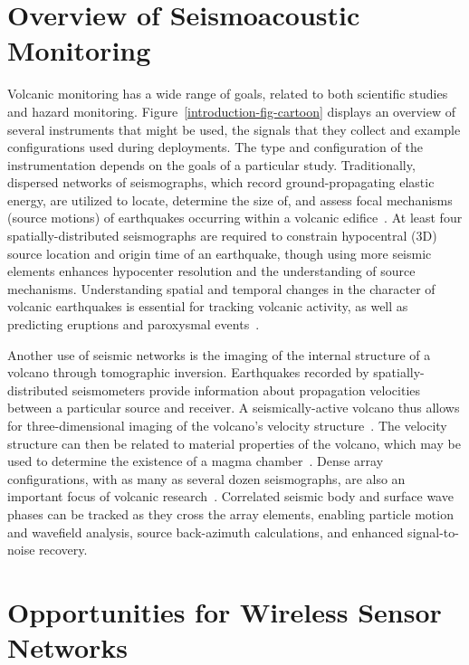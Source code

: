 \section{Overview of Seismoacoustic Monitoring}

Volcanic monitoring has a wide range of goals, related to both scientific
studies and hazard monitoring. Figure~\ref{introduction-fig-cartoon} displays
an overview of several instruments that might be used, the signals that they
collect and example configurations used during deployments. The type and
configuration of the instrumentation depends on the goals of a particular
study.  Traditionally, dispersed networks of seismographs, which record
ground-propagating elastic energy, are utilized to locate, determine the size
of, and assess focal mechanisms (source motions) of earthquakes occurring
within a volcanic edifice~\cite{Chouet03}.  At least four
spatially-distributed seismographs are required to constrain hypocentral (3D)
source location and origin time of an earthquake, though using more seismic
elements enhances hypocenter resolution and the understanding of source
mechanisms. Understanding spatial and temporal changes in the character of
volcanic earthquakes is essential for tracking volcanic activity, as well as
predicting eruptions and paroxysmal events~\cite{McNutt96}. 

Another use of seismic networks is the imaging of the internal structure of a
volcano through tomographic inversion.  Earthquakes recorded by
spatially-distributed seismometers provide information about propagation
velocities between a particular source and receiver.  A seismically-active
volcano thus allows for three-dimensional imaging of the volcano's velocity
structure~\cite{Benz96,Phillips91}. The velocity structure can then be
related to material properties of the volcano, which may be used to determine
the existence of a magma chamber~\cite{Lees89,Moran99}.  Dense array
configurations, with as many as several dozen seismographs, are also an
important focus of volcanic research~\cite{Dietel89,Neuberg94}. Correlated
seismic body and surface wave phases can be tracked as they cross the array
elements, enabling particle motion and wavefield analysis, source
back-azimuth calculations, and enhanced signal-to-noise recovery.

\section{Opportunities for Wireless Sensor Networks}

